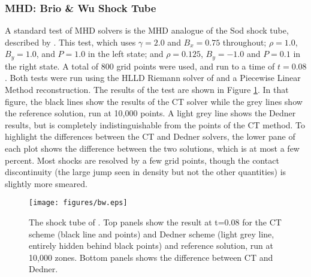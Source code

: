 \subsubsection{MHD: Brio \& Wu Shock Tube}
\label{sec.tests.bw}

A standard test of MHD solvers is the MHD analogue of the Sod shock tube,
described by \citet{Brio88}.   This test, which uses $\gamma=2.0$ and $B_x=0.75$
throughout; $\rho=1.0$, $B_y=1.0$, and $P=1.0$ in the left state; and $\rho=0.125$,
$B_y=-1.0$ and $P=0.1$ in the right state.  A total of 800 grid points were
used, and run to a time of $t=0.08$.  Both tests were run using the HLLD Riemann
solver of \citet{Miyoshi05} and a Piecewise Linear Method \citep{Colella85} reconstruction.  The
results of the test are shown in Figure \ref{fig.brio}.  In that figure, the
black lines show the results of the CT solver while the grey lines show the
reference solution, run at 10,000 points.  A light grey line shows the Dedner
results, but is completely indistinguishable from the points of the CT method.
To highlight the differences between the CT and Dedner solvers, 
the lower pane of each plot shows the difference between the two solutions,
which is at most a few percent.   Most shocks are resolved by a few grid points,
though the contact discontinuity (the large jump seen in density but not
the other quantities) is slightly more smeared.

\begin{figure}
\begin{center}
\texttt{[image: figures/bw.eps]}
\caption{The shock tube of \citet{Brio88}.  Top panels show the result at
t=0.08
for the CT scheme (black line and points) and Dedner scheme (light grey line,
entirely hidden behind black points) and reference solution, run at 10,000
zones.  Bottom panels
shows the difference between CT and Dedner.}
\label{fig.brio}
\end{center}
\end{figure}
